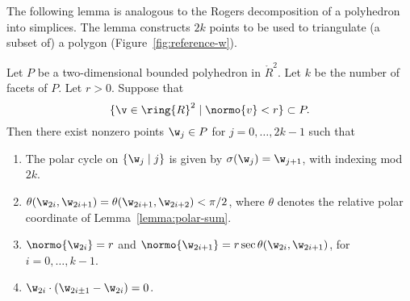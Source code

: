 The following lemma is analogous to the Rogers decomposition of a
polyhedron into simplices.  The lemma constructs $2k$ points to be
used to triangulate (a subset of) a polygon (Figure~\ref{fig:reference-w}).


\begin{lemma}[]\label{lemma:2D-poly}
Let $P$ be a two-dimensional bounded polyhedron in $\ring{R}^2$.
Let $k$ be the number of facets of $P$.  Let $r>0$.  Suppose that
\[
\{\v\in \ring{R}^2\mid  \normo{v}< r\} \subset P.
\]
Then there exist nonzero points $\w_j\in P$
for $j=0,\ldots,2 k-1$ such that
\begin{enumerate}
\item The polar cycle on  $\{\w_j\mid j\}$ is given by
$\sigma(\w_j) = \w_{j+1}$, with indexing mod $2k$.
\item $\theta(\w_{2i},\w_{2i+1}) = \theta(\w_{2i+1},\w_{2i+2}) < \pi/2$,  
where $\theta$ denotes the
relative polar coordinate of Lemma~\ref{lemma:polar-sum}.
\item $\normo{\w_{2i}}=r$ and 
$\normo{\w_{2i+1}} = r\sec \theta(\w_{2i},\w_{2i+1})$, 
for $i=0,\ldots,k-1$.
\item $\w_{2i}\cdot (\w_{2i\pm1}-\w_{2i}) = 0$.
\end{enumerate}
\end{lemma}

\figYAHDBVO %

